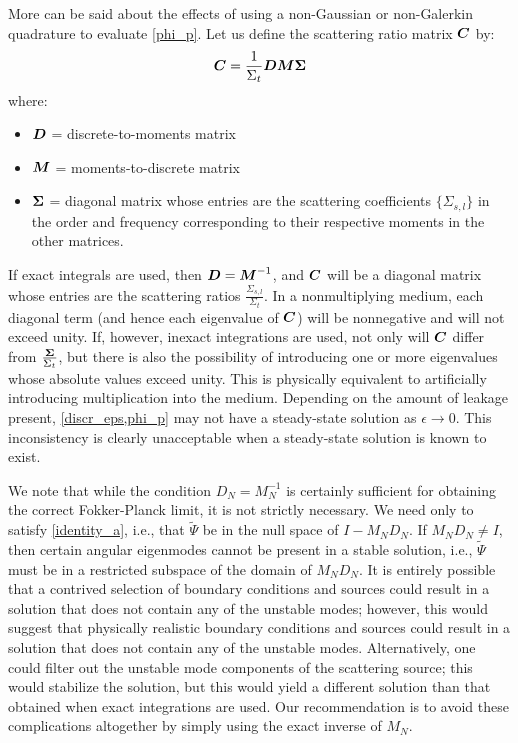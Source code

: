 More can be said about the effects of using a non-Gaussian or non-Galerkin
quadrature to evaluate \cref{phi_p}. Let us define the scattering
ratio matrix $\boldsymbol{C}$ by:
\begin{equation}
\boldsymbol{C} = \frac{1}{\Sigma_t}\boldsymbol{D}\boldsymbol{M}\boldsymbol{\Sigma}
\end{equation}
where:
\begin{itemize}
\item $\boldsymbol{D}$ = discrete-to-moments matrix
\item $\boldsymbol{M}$ = moments-to-discrete matrix
\item $\boldsymbol{\Sigma}$ = diagonal matrix whose entries are the scattering
coefficients $\{\Sigma_{s,l}\}$ in the order and frequency corresponding to
their respective moments in the other matrices.
\end{itemize}
If exact integrals are used, then $\boldsymbol{D}=\boldsymbol{M}^{-1}$, and $\boldsymbol{C}$ will be a
diagonal matrix whose entries are the scattering ratios
$\frac{\Sigma_{s,l}}{\Sigma_t}$. In a nonmultiplying medium, each diagonal
term (and hence each eigenvalue of $\boldsymbol{C}$) will be nonnegative and will not
exceed unity. If, however, inexact integrations are used, not only will
$\boldsymbol{C}$ differ from $\frac{\boldsymbol{\Sigma}}{\Sigma_t}$, but there is also the
possibility of introducing one or more eigenvalues whose absolute values
exceed unity. This is physically equivalent to artificially introducing
multiplication into the medium. Depending on the amount of leakage present,
\cref{discr_eps,phi_p} may not have a steady-state
solution as $\epsilon\rightarrow 0$. This inconsistency is clearly
unacceptable when a steady-state solution is known to exist.

We note that while the condition $D_N=M_N^{-1}$ is certainly sufficient for
obtaining the correct Fokker-Planck limit, it is not strictly necessary. We
need only to satisfy \cref{identity_a}, i.e., that $\tilde{\Psi}$ be
in the null space of $I-M_ND_N$. If $M_N D_N\neq I$, then certain angular
eigenmodes cannot be present in a stable solution, i.e., $\tilde{\Psi}$ must
be in a restricted subspace of the domain of $M_N D_N$. It is entirely
possible that a contrived selection of boundary conditions and sources could
result in a solution that does not contain any of the unstable modes; however,
this would suggest that physically realistic boundary conditions and
sources could result in a solution that does not contain any of the unstable
modes. Alternatively, one could filter out the unstable mode components of the
scattering source; this would stabilize the solution, but this would yield a
different solution than that obtained when exact integrations are used. Our
recommendation is to avoid these complications altogether by simply using the
exact inverse of $M_N$.\\

